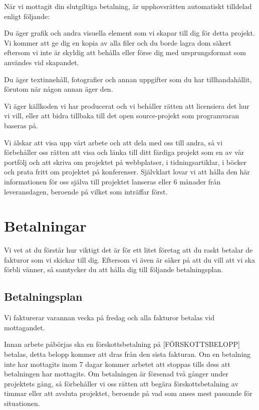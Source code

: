 \documentclass[10pt,a4paper,parskip]{scrartcl}
\begin{document}
När vi mottagit din slutgiltiga betalning, är upphovsrätten automatiskt
tilldelad enligt följande:

Du äger grafik och andra visuella element som vi skapar till dig för detta
projekt. Vi kommer att ge dig en kopia av alla filer och du borde lagra dom
säkert eftersom vi inte är skyldig att behålla eller förse dig med
ursprungsformat som användes vid skapandet.

Du äger textinnehåll, fotografier och annan uppgifter som du har
tillhandahållit, förutom när någon annan äger den.

Vi äger källkoden vi har producerat och vi behåller rätten att licensiera det
hur vi vill, eller att bidra tillbaka till det open source-projekt som
programvaran baseras på.

Vi älskar att visa upp vårt arbete och att dela med oss till andra, så vi
förbehåller oss rätten att visa och länka till ditt färdiga projekt som en av
vår portfölj och att skriva om projektet på webbplatser, i tidningsartiklar, i
böcker och prata fritt om projektet på konferenser. Självklart lovar vi att
hålla den här informationen för oss själva till projektet lanseras eller 6
månader från leveransdagen, beroende på vilket som inträffar först.

\section{Betalningar}

Vi vet at du förstår hur viktigt det är för ett litet företag att du raskt
betalar de fakturor som vi skickar till dig. Eftersom vi även är säker på att
du vill att vi ska förbli vänner, så samtycker du att hålla dig till följande
betalningsplan.

\subsection{Betalningsplan}
Vi fakturerar varannan vecka på fredag och alla fakturor betalas vid
mottagandet.

Innan arbete påbörjas ska en förskottsbetalning på [FÖRSKOTTSBELOPP] betalas,
detta belopp kommer att dras från den sista fakturan. Om en betalning inte har
mottagits inom 7 dagar kommer arbetet att stoppas tills dess att betalningen
har mottagits. Om betalningen är försenad två gånger under projektets gång, så
förbehåller vi oss rätten att begära förskottsbetalning av timmar eller att
avsluta projektet, beroende på vad som anses mest passande för situationen.
\end{document}
